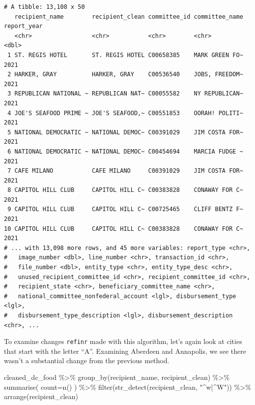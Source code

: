 \documentclass[
  letterpaper,
  DIV=11,
  numbers=noendperiod]{scrreprt}
\newenvironment{Shaded}{\begin{snugshade}}{\end{snugshade}}
\newcommand{\AttributeTok}[1]{\textcolor[rgb]{0.40,0.45,0.13}{#1}}
\newcommand{\FunctionTok}[1]{\textcolor[rgb]{0.28,0.35,0.67}{#1}}
\newcommand{\NormalTok}[1]{\textcolor[rgb]{0.00,0.23,0.31}{#1}}
\newcommand{\SpecialCharTok}[1]{\textcolor[rgb]{0.37,0.37,0.37}{#1}}
\newcommand{\StringTok}[1]{\textcolor[rgb]{0.13,0.47,0.30}{#1}}
\begin{document}
\begin{verbatim}
# A tibble: 13,108 x 50
   recipient_name        recipient_clean committee_id committee_name report_year
   <chr>                 <chr>           <chr>        <chr>                <dbl>
 1 ST. REGIS HOTEL       ST. REGIS HOTEL C00658385    MARK GREEN FO~        2021
 2 HARKER, GRAY          HARKER, GRAY    C00536540    JOBS, FREEDOM~        2021
 3 REPUBLICAN NATIONAL ~ REPUBLICAN NAT~ C00055582    NY REPUBLICAN~        2021
 4 JOE'S SEAFOOD PRIME ~ JOE'S SEAFOOD,~ C00551853    OORAH! POLITI~        2021
 5 NATIONAL DEMOCRATIC ~ NATIONAL DEMOC~ C00391029    JIM COSTA FOR~        2021
 6 NATIONAL DEMOCRATIC ~ NATIONAL DEMOC~ C00454694    MARCIA FUDGE ~        2021
 7 CAFE MILANO           CAFE MILANO     C00391029    JIM COSTA FOR~        2021
 8 CAPITOL HILL CLUB     CAPITOL HILL C~ C00383828    CONAWAY FOR C~        2021
 9 CAPITOL HILL CLUB     CAPITOL HILL C~ C00725465    CLIFF BENTZ F~        2021
10 CAPITOL HILL CLUB     CAPITOL HILL C~ C00383828    CONAWAY FOR C~        2021
# ... with 13,098 more rows, and 45 more variables: report_type <chr>,
#   image_number <dbl>, line_number <chr>, transaction_id <chr>,
#   file_number <dbl>, entity_type <chr>, entity_type_desc <chr>,
#   unused_recipient_committee_id <chr>, recipient_committee_id <chr>,
#   recipient_state <chr>, beneficiary_committee_name <chr>,
#   national_committee_nonfederal_account <lgl>, disbursement_type <lgl>,
#   disbursement_type_description <lgl>, disbursement_description <chr>, ...
\end{verbatim}

To examine changes \texttt{refinr} made with this algorithm, let's again
look at cities that start with the letter ``A''. Examining Aberdeen and
Annapolis, we see there wasn't a substantial change from the previous
method.

\begin{Shaded}
\begin{Highlighting}[]
\NormalTok{cleaned\_dc\_food }\SpecialCharTok{\%\textgreater{}\%}
  \FunctionTok{group\_by}\NormalTok{(recipient\_name, recipient\_clean) }\SpecialCharTok{\%\textgreater{}\%}
  \FunctionTok{summarise}\NormalTok{(}
    \AttributeTok{count=}\FunctionTok{n}\NormalTok{()}
\NormalTok{  ) }\SpecialCharTok{\%\textgreater{}\%}
  \FunctionTok{filter}\NormalTok{(}\FunctionTok{str\_detect}\NormalTok{(recipient\_clean, }\StringTok{"\^{}w|\^{}W"}\NormalTok{)) }\SpecialCharTok{\%\textgreater{}\%}
  \FunctionTok{arrange}\NormalTok{(recipient\_clean)}
\end{Highlighting}
\end{Shaded}
\end{document}

